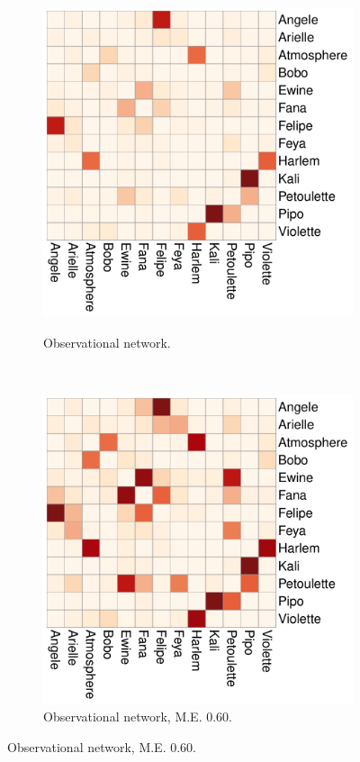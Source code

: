 \documentclass[Afour,sageh,times]{sagej}
\begin{document}
\begin{figure}[t]
\begin{minipage}[t]{0.31\textwidth}
\begin{subfigure}[t]{0.99\textwidth}
        \label{MonkeyBusiness1}
  \end{subfigure}
  \begin{subfigure}[t]{0.99\textwidth}
    \centering
        \caption{Observational network.}
        \includegraphics[width=\textwidth]{Figures/Baboons_Obs.pdf}
          \label{MonkeyBusiness2}
  \end{subfigure}
\end{minipage}%
~
\begin{minipage}[t]{0.31\textwidth}
\centering
  \begin{subfigure}[t]{0.99\textwidth}
    \centering
        \caption{Observational network, M.E. 0.60.}
        \label{MonkeyBusiness3}
        \includegraphics[width=\textwidth]{Figures/Baboons_ME_2.pdf}

\end{subfigure}
\end{minipage}
\end{figure}
\end{document}
